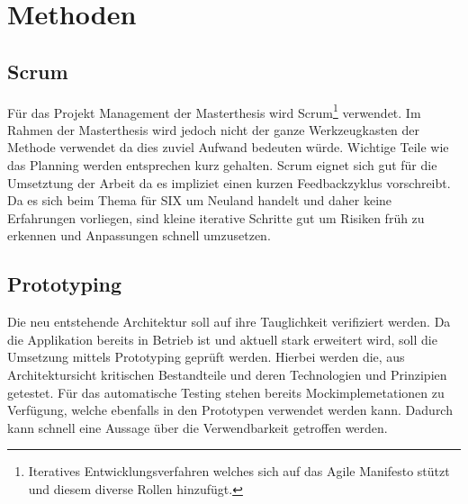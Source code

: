 \section{Methoden}

\subsection{Scrum}

Für das Projekt Management der Masterthesis wird Scrum\footnote{Iteratives Entwicklungsverfahren welches sich auf das Agile Manifesto stützt und diesem diverse Rollen hinzufügt. } verwendet. Im Rahmen der Masterthesis wird jedoch nicht der ganze Werkzeugkasten der Methode verwendet da dies zuviel Aufwand bedeuten würde. Wichtige Teile wie das Planning werden entsprechen kurz gehalten.
Scrum eignet sich gut für die Umsetztung der Arbeit da es impliziet einen kurzen Feedbackzyklus vorschreibt. Da es sich beim Thema für SIX um Neuland handelt und daher keine Erfahrungen vorliegen, sind kleine iterative Schritte gut um Risiken früh zu erkennen und Anpassungen schnell umzusetzen.

\subsection{Prototyping}
Die neu entstehende Architektur soll auf ihre Tauglichkeit verifiziert werden. Da die Applikation bereits in Betrieb ist und aktuell stark erweitert wird, soll die Umsetzung mittels Prototyping geprüft werden. Hierbei werden die, aus Architektursicht kritischen Bestandteile und deren Technologien und Prinzipien getestet. Für das automatische Testing stehen bereits Mockimplemetationen zu Verfügung, welche ebenfalls in den Prototypen verwendet werden kann. Dadurch kann schnell eine Aussage über die Verwendbarkeit getroffen werden. 
